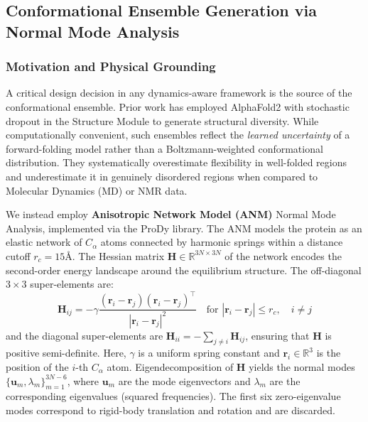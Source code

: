 \documentclass{article}
\begin{document}
\subsection{Conformational Ensemble Generation via Normal Mode Analysis}

\subsubsection{Motivation and Physical Grounding}
A critical design decision in any dynamics-aware framework is the source of the conformational ensemble. Prior work has employed AlphaFold2 with stochastic dropout in the Structure Module to generate structural diversity. While computationally convenient, such ensembles reflect the \emph{learned uncertainty} of a forward-folding model rather than a Boltzmann-weighted conformational distribution. They systematically overestimate flexibility in well-folded regions and underestimate it in genuinely disordered regions when compared to Molecular Dynamics (MD) or NMR data.

We instead employ \textbf{Anisotropic Network Model (ANM)} Normal Mode Analysis, implemented via the ProDy library. The ANM models the protein as an elastic network of $C_\alpha$ atoms connected by harmonic springs within a distance cutoff $r_c = 15$\AA. The Hessian matrix $\mathbf{H} \in \mathbb{R}^{3N \times 3N}$ of the network encodes the second-order energy landscape around the equilibrium structure. The off-diagonal $3 \times 3$ super-elements are:
\begin{equation}
    \mathbf{H}_{ij} = -\gamma \frac{(\mathbf{r}_i - \mathbf{r}_j)(\mathbf{r}_i - \mathbf{r}_j)^\top}{|\mathbf{r}_i - \mathbf{r}_j|^2} \quad \text{for } |\mathbf{r}_i - \mathbf{r}_j| \leq r_c, \quad i \neq j
\end{equation}
and the diagonal super-elements are $\mathbf{H}_{ii} = -\sum_{j \neq i} \mathbf{H}_{ij}$, ensuring that $\mathbf{H}$ is positive semi-definite. Here, $\gamma$ is a uniform spring constant and $\mathbf{r}_i \in \mathbb{R}^3$ is the position of the $i$-th $C_\alpha$ atom. Eigendecomposition of $\mathbf{H}$ yields the normal modes $\{\mathbf{u}_m, \lambda_m\}_{m=1}^{3N-6}$, where $\mathbf{u}_m$ are the mode eigenvectors and $\lambda_m$ are the corresponding eigenvalues (squared frequencies). The first six zero-eigenvalue modes correspond to rigid-body translation and rotation and are discarded.
\end{document}

